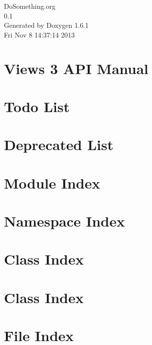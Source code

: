 \documentclass[a4paper]{book}
\begin{document}
\hypersetup{pageanchor=false}
\begin{titlepage}
\vspace*{7cm}
\begin{center}
{\Large DoSomething.org \\[1ex]\large 0.1 }\\
\vspace*{1cm}
{\large Generated by Doxygen 1.6.1}\\
\vspace*{0.5cm}
{\small Fri Nov 8 14:37:14 2013}\\
\end{center}
\end{titlepage}
\clearemptydoublepage
{}
\tableofcontents
\clearemptydoublepage
{}
\hypersetup{pageanchor=true}
\chapter{Views 3 API Manual}
\label{index}\hypertarget{index}{}
\chapter{Todo List}
\label{todo}
\hypertarget{todo}{}

\chapter{Deprecated List}
\label{deprecated}
\hypertarget{deprecated}{}

\chapter{Module Index}

\chapter{Namespace Index}

\chapter{Class Index}

\chapter{Class Index}

\chapter{File Index}

\end{document}
